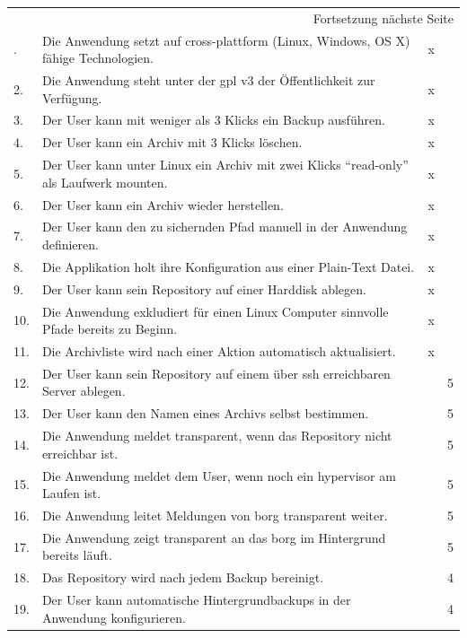 \begin{longtable}{|p{1cm}|p{9cm}|p{1.5cm}|p{2cm}|}
\hline
\endhead
\hline\multicolumn{4}{r}{Fortsetzung nächste Seite} \\
\endfoot
\endlastfoot
\hline
1. & Die Anwendung setzt auf cross-plattform (Linux, Windows, OS X) fähige Technologien. & x & \\
\hline
2. & Die Anwendung steht unter der \gls{gpl} v3 der Öffentlichkeit zur Verfügung. & x & \\
\hline
3. & Der User kann mit weniger als 3 Klicks ein Backup ausführen. & x & \\
\hline
4. & Der User kann ein Archiv mit 3 Klicks löschen. & x & \\
\hline
5. & Der User kann unter Linux ein Archiv mit zwei Klicks "`read-only"' als Laufwerk mounten. & x & \\
\hline
6. & Der User kann ein Archiv wieder herstellen. & x & \\
\hline
7. & Der User kann den zu sichernden Pfad manuell in der Anwendung definieren. & x & \\
\hline
8. & Die Applikation holt ihre Konfiguration aus einer Plain-Text Datei. & x & \\
\hline
9. & Der User kann sein Repository auf einer Harddisk ablegen. & x & \\
\hline
10. & Die Anwendung exkludiert für einen Linux Computer sinnvolle Pfade bereits zu Beginn. & x & \\
\hline
11. & Die Archivliste wird nach einer Aktion automatisch aktualisiert. & x & \\
\hline
12. & Der User kann sein Repository auf einem über \gls{ssh} erreichbaren Server ablegen. &  & 5\\
\hline
13. & Der User kann den Namen eines Archivs selbst bestimmen. &  & 5\\
\hline
14. & Die Anwendung meldet transparent, wenn das Repository nicht erreichbar ist. &  & 5\\
\hline
15. & Die Anwendung meldet dem User, wenn noch ein \gls{hypervisor} am Laufen ist. &  & 5\\
\hline
16. & Die Anwendung leitet Meldungen von \gls{borg} transparent weiter. &  & 5\\
\hline
17. & Die Anwendung zeigt transparent an das \gls{borg} im Hintergrund bereits läuft. &  & 5\\
\hline
18. & Das Repository wird nach jedem Backup bereinigt. &  & 4\\
\hline
19. & Der User kann automatische Hintergrundbackups in der Anwendung konfigurieren. &  & 4\\

\end{longtable}
